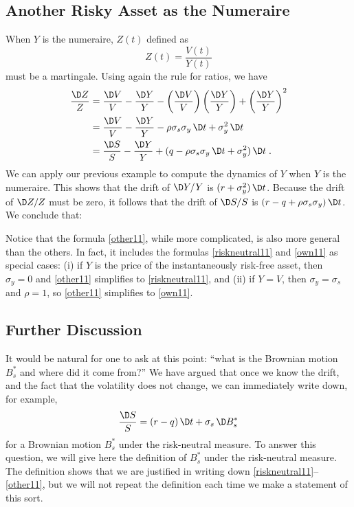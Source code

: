\subsection*{Another Risky Asset as the Numeraire}
When $Y$ is the numeraire, $Z(t)$ defined as 
$$Z(t) = \frac{V(t)}{Y(t)}$$ must be a martingale.  Using again the rule for ratios, we have
\begin{align*}
\frac{\D Z}{Z} &= \frac{\D V}{V} -\frac{\D Y}{Y}- \left(\frac{\D V}{V}\right)\left(\frac{\D Y}{Y}\right) + \left(\frac{\D Y}{Y}\right)^2\\
& = \frac{\D V}{V} -\frac{\D Y}{Y} -\rho\sigma_s\sigma_y\,\D t+\sigma_y^2\,\D t\\
&= \frac{\D S}{S} -\frac{\D Y}{Y} + (q-\rho\sigma_s\sigma_y\,\D t+\sigma_y^2)\,\D t\; .
\end{align*}
We can apply our previous example to compute the dynamics of $Y$ when $Y$ is the numeraire.  This shows that the drift of $\D Y/Y$ is $(r+ \sigma^2_y)\,\D t$.  Because the drift of $\D Z/Z$ must be zero, it follows that the drift of $\D S/S$ is
$(r-q+ \rho\sigma_s\sigma_y)\,\D t$.  We conclude that:

Notice that the formula \eqref{other11}, while more complicated, is also more general than the others.  In fact, it includes the formulas \eqref{riskneutral11} and \eqref{own11} as special cases: (i) if $Y$ is the price of the instantaneously risk-free asset, then $\sigma_y=0$ and \eqref{other11} simplifies to \eqref{riskneutral11}, and (ii) if $Y=
V$, then $\sigma_y=\sigma_s$ and $\rho=1$, so \eqref{other11} simplifies to \eqref{own11}.

\subsection*{Further Discussion}

It would be natural for one to ask at this point: ``what is the Brownian motion $B^*_s$ and where did it come from?''  We have argued that once we know the drift, and the fact that the volatility does not change, we can immediately write down, for example, 
$$\frac{\D S}{S} = (r-q)\,\D t + \sigma_s\,\D B^*_s$$
for a Brownian motion $B^*_s$ under the risk-neutral measure.  To answer this question, we will give here the definition of $B^*_s$ under the risk-neutral measure.  The definition shows that we are justified in writing down  \eqref{riskneutral11}--\eqref{other11}, but we will not repeat the definition each time we make a statement of this sort.     

